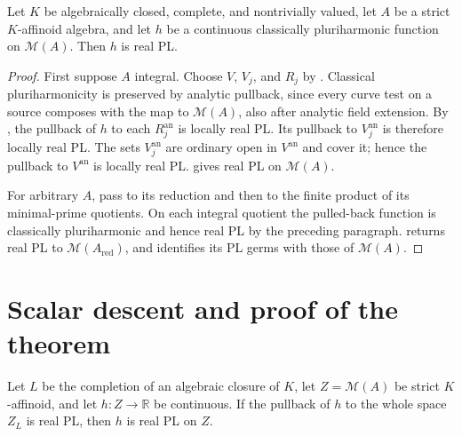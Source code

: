 \documentclass[11pt,a4paper]{amsart}
\begin{document}
\begin{proposition}\label{prop:algebraically-closed-case}
Let $K$ be algebraically closed, complete, and nontrivially valued, let $A$ be a strict $K$-affinoid algebra, and let $h$ be a continuous classically pluriharmonic function on $\mathcal M(A)$. Then $h$ is real PL.
\end{proposition}

\begin{proof}
First suppose $A$ integral. Choose $V$, $V_j$, and $R_j$ by . Classical pluriharmonicity is preserved by analytic pullback, since every curve test on a source composes with the map to $\mathcal M(A)$, also after analytic field extension. By , the pullback of $h$ to each $R_j^{\mathrm{an}}$ is locally real PL. Its pullback to $V_j^{\mathrm{an}}$ is therefore locally real PL. The sets $V_j^{\mathrm{an}}$ are ordinary open in $V^{\mathrm{an}}$ and cover it; hence the pullback to $V^{\mathrm{an}}$ is locally real PL.  gives real PL on $\mathcal M(A)$.

For arbitrary $A$, pass to its reduction and then to the finite product of its minimal-prime quotients. On each integral quotient the pulled-back function is classically pluriharmonic and hence real PL by the preceding paragraph.  returns real PL to $\mathcal M(A_{\mathrm{red}})$, and  identifies its PL germs with those of $\mathcal M(A)$.
\end{proof}

\section{Scalar descent and proof of the theorem}\label{sec:scalar-descent}

\begin{proposition}\label{prop:completed-algebraic-descent}
Let $L$ be the completion of an algebraic closure of $K$, let $Z=\mathcal M(A)$ be strict $K$-affinoid, and let $h:Z\to\mathbb R$ be continuous. If the pullback of $h$ to the whole space $Z_L$ is real PL, then $h$ is real PL on $Z$.
\end{proposition}
\end{document}
